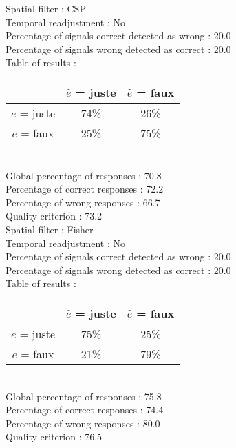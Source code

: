 Spatial filter : CSP \\
Temporal readjustment : No \\
Percentage of signals correct detected as wrong :   20.0 \\
Percentage of signals wrong detected as correct :   20.0 \\
Table of results : \\
\begin{tabular}{|c|c|c|}
\hline				& $\hat{e}$ = juste & $\hat{e}$ = faux \\
\hline  $e$ = juste	&     74\%			&     26\%		\\
\hline  $e$ = faux	&     25\%			&     75\%		\\
\hline
\end{tabular}\\
Global percentage of responses :   70.8 \\
Percentage of correct responses :   72.2 \\
Percentage of wrong responses :   66.7 \\
Quality criterion :   73.2 \\

Spatial filter : Fisher \\
Temporal readjustment : No \\
Percentage of signals correct detected as wrong :   20.0 \\
Percentage of signals wrong detected as correct :   20.0 \\
Table of results : \\
\begin{tabular}{|c|c|c|}
\hline				& $\hat{e}$ = juste & $\hat{e}$ = faux \\
\hline  $e$ = juste	&     75\%			&     25\%		\\
\hline  $e$ = faux	&     21\%			&     79\%		\\
\hline
\end{tabular}\\
Global percentage of responses :   75.8 \\
Percentage of correct responses :   74.4 \\
Percentage of wrong responses :   80.0 \\
Quality criterion :   76.5 \\

